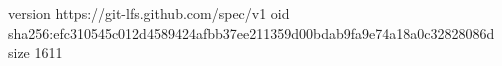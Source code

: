 version https://git-lfs.github.com/spec/v1
oid sha256:efc310545c012d4589424afbb37ee211359d00bdab9fa9e74a18a0c32828086d
size 1611
